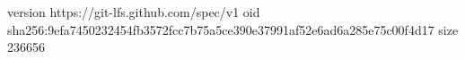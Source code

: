 version https://git-lfs.github.com/spec/v1
oid sha256:9efa7450232454fb3572fcc7b75a5ce390e37991af52e6ad6a285e75c00f4d17
size 236656
